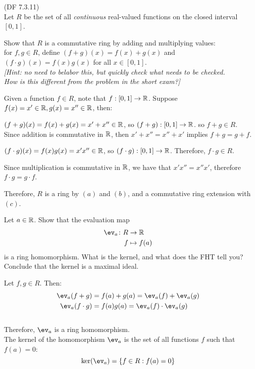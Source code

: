 \begin{problem}{(\textsf{DF 7.3.11})} \\
  Let $R$ be the set of all \emph{continuous} real-valued functions
  on the closed interval $[0,1]$.  
  \begin{enumalph}
    \item Show that $R$ is a commutative ring by adding and multiplying values: \\
      for $f,g \in R$, define $(f+g)(x)=f(x)+g(x)$ and
      $(f\cdot g)(x)=f(x)g(x)$ for all $x \in [0,1]$. \\
      \emph{[Hint: no need to belabor this, but quickly check what needs to be checked. \\
      How is this different from the problem in the short exam?]}
      \begin{Answer}
        Given a function $f \in R$, note that $f : [0,1] \to \mathbb{R}$.
        Suppose $f(x) = x' \in \mathbb{R}, g(x) = x'' \in \mathbb{R}$, then:
        \begin{enumalph}
          \item $(f+g)(x) = f(x) + g(x) = x' + x'' \in \mathbb{R}$, so $(f+g) : [0,1] \to \mathbb{R}$.
            so $f+g \in R$. \\
            Since addition is commutative in $\mathbb{R}$, then
            $x' + x'' = x'' + x'$ implies $f+g = g+f$.
          \item $(f \cdot g)(x) = f(x)g(x) = x'x'' \in \mathbb{R}$, so $(f\cdot g) : [0,1] \to \mathbb{R}$.
            Therefore, $f\cdot g \in R$.
          \item Since multiplication is commutative in $\mathbb{R}$,
            we have that $x'x'' = x''x'$, therefore $f\cdot g = g\cdot f$.
        \end{enumalph}
        Therefore, $R$ is a ring by $(a)$ and $(b)$, and a commutative ring
        extension with $(c)$.
      \end{Answer}
      


    \item Let $a \in \mathbb{R}$.  Show that the \textsf{evaluation} map
      \begin{align*}
        \ev_a \colon R &\to \R \\
        f &\mapsto f(a)
      \end{align*}
      is a ring homomorphism.  What is the kernel, and what does the FHT tell you?  
      Conclude that the kernel is a maximal ideal.
      \begin{Answer}
        Let $f,g \in R$.  Then:
        \begin{align*}
          \ev_a(f+g) &= f(a)+g(a) = \ev_a(f) + \ev_a(g) \\
          \ev_a(f\cdot g) &= f(a)g(a) = \ev_a(f)\cdot \ev_a(g)
        \end{align*} \\
        Therefore, $\ev_a$ is a ring homomorphism. \\
        The kernel of the homomorphism $\ev_a$ is the set
        of all functions $f$ such that $f(a) = 0$: 
        \[ \ker(\ev_a) = \left\{f \in R : f(a) = 0 \right\} \]


\end{Answer}
\end{enumalph}
\end{problem}
